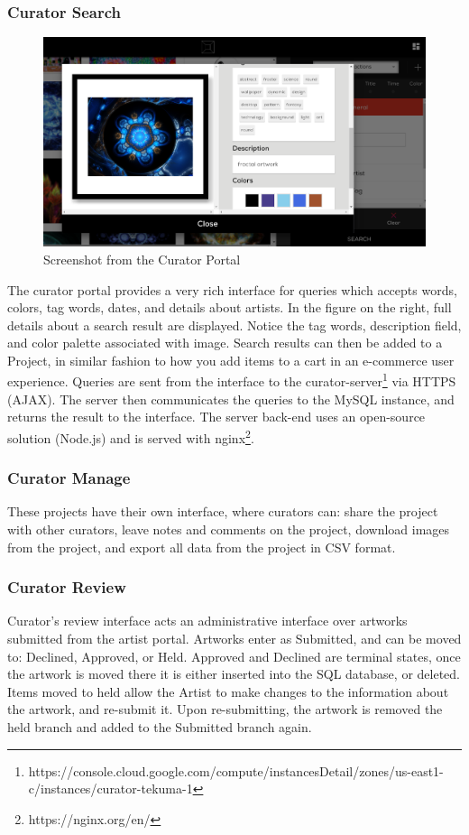 \documentclass[fontsize=12pt]{scrartcl} %
\numberwithin{equation}{section} %
\numberwithin{figure}{section} %
\numberwithin{table}{section} %
\begin{document}
\subsubsection{Curator Search}
\begin{figure}
    \includegraphics[scale=0.2]{./img/curator}
    \caption{Screenshot from the Curator Portal}
    \label{}
\end{figure}

The curator portal provides a very rich interface for queries which accepts words, colors, tag words, dates, and details about artists. In the figure on the right, full details about a search result are displayed. Notice the tag words, description field, and color palette associated with image.
Search results can then be added to a Project, in similar fashion to how you add items to a cart in an e-commerce user experience. Queries are sent from the interface to the curator-server\footnote{https://console.cloud.google.com/compute/instancesDetail/zones/us-east1-c/instances/curator-tekuma-1} via HTTPS (AJAX). The server then communicates the queries to the MySQL instance, and returns the result to the interface.  The server back-end uses an open-source solution (Node.js) and is served with nginx\footnote{https://nginx.org/en/}.

\subsubsection{Curator Manage}
These projects have their own interface, where curators can: share the project with other curators, leave notes and comments on the project, download images from the project, and export all data from the project in CSV format.

\subsubsection{Curator Review}
Curator's review interface acts an administrative interface over artworks submitted from the artist portal. Artworks enter as Submitted, and can be moved to: Declined, Approved, or Held.  Approved and Declined are terminal states, once the artwork is moved there it is either inserted into the SQL database, or deleted. Items moved to held allow the Artist to make changes to the information about the artwork, and re-submit it. Upon re-submitting, the artwork is removed the held branch and added to the Submitted branch again.
\end{document}
